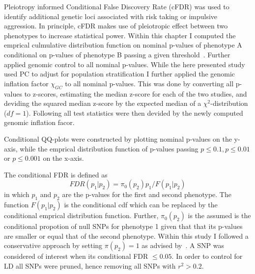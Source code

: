 Pleiotropy informed Conditional False Discovery Rate (cFDR) was used to identify additional genetic loci associated with risk taking or impulsive aggression. 
In principle, cFDR makes use of pleiotropic effect between two phenotypes to increase statistical power.
Within this chapter I computed the emprical culmulative distribution function on nominal p-values of phenotype A conditional on p-values of phenotype B passing a given threshold~\cite{Andreassen2013}.
Further applied genomic control to all nominal p-values.
While the here presented study used PC to adjust for population stratification I further applied the genomic inflation factor $\chi_{GC}$ to all nominal p-values.
This was done by converting all p-values to z-scores, estimating the median z-score for each of the two studies, and deviding the squared median z-score by the expected median of a $\chi^2$-distribution ($df=1$).
Following all test statistics were then devided by the newly computed genomic inflation facor. 

Conditional QQ-plots were constructed by plotting nominal p-values on the y-axis, while the emprical distribution function of p-values passing $p\leq0.1, p\leq 0.01$ or $ p\leq 0.001$ on the x-axis.

The conditional FDR is defined as~\cite{Andreassen2013}
\begin{equation}
  FDR(p_1|p_2)=\pi_0(p_2)p_1/F(p_1|p_2)
\end{equation}
in which $p_1$ and $p_2$ are the p-values for the first and second phenotype.
The function $F(p_1|p_2)$ is the conditional cdf which can be replaced by the conditional emprical distribution function.
Further, $\pi_0(p_2)$ is the assumed is the conditional propotion of null SNPs for phenotype 1 given that that its p-values are smaller or equal that of the second phenotype.
Within this study I followed a conservative approach by setting $\pi(p_2)=1$ as advised by~\citet{Andreassen2013}.
A SNP was considered of interest when its conditional FDR $\leq 0.05$.
In order to control for LD all SNPs were pruned, hence removing all SNPs with $r^2 > 0.2$.
